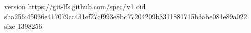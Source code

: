version https://git-lfs.github.com/spec/v1
oid sha256:45036e417079cc431ef27cf993e8bc77204209b3311881715b3abe081e89a022
size 1398256
